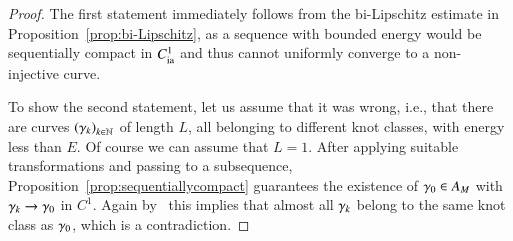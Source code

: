\begin{proof}
 The first statement immediately follows from the bi-Lipschitz estimate
 in Proposition~\ref{prop:bi-Lipschitz}, as a sequence with bounded energy 
 would be sequentially compact in $\Cia$ and thus cannot uniformly converge 
 to a non-injective curve.   
 
 To show the second statement, let us assume that it was wrong, i.e.,
 that there are curves $\seqn[k]{\g}$ of length $L$,
 all belonging to different knot classes,
 with energy less than $E$. Of course we can assume that
 $L=1$.
 After applying suitable transformations and passing to a subsequence,
 Proposition~\ref{prop:sequentiallycompact} guarantees the existence
 of $\g_{0}\in A_{M}$ with $\g_{k}\to\g_{0}$ in $C^1$.
 Again by~\cite{blatt:isot,reiter:isot}
 this implies that almost all $\g_k$ belong to the
 same knot class as $\g_0$, which is a contradiction.
\end{proof}